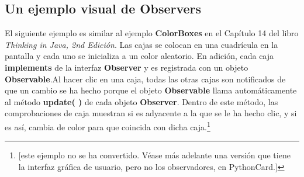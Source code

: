 \subsection*{Un ejemplo visual de Observers}
\label{subsec:uevdo}

El siguiente ejemplo es similar al ejemplo \textbf{ColorBoxes} en el Capítulo 14 del libro \textit{Thinking in Java, 2nd Edición}. Las cajas se colocan en una cuadrícula en la pantalla y cada uno se inicializa a un color aleatorio. 
En adición, cada caja \textbf{implements} de la interfaz \textbf{Observer} y es registrada con un objeto \textbf{Observable}.Al hacer clic en una caja, todas las otras cajas son notificados de que un cambio se ha hecho porque el objeto \textbf{Observable} llama automáticamente al método \textbf{update( )} de cada objeto \textbf{Observer}.  Dentro de este método, las comprobaciones de caja muestran si es adyacente a la que se le ha hecho clic, y si es así, cambia de color para que coincida con dicha caja.\footnote{[este ejemplo no se ha convertido. Véase más adelante una versión que tiene la interfaz gráfica de usuario, pero no los observadores, en PythonCard.]}  \newline



